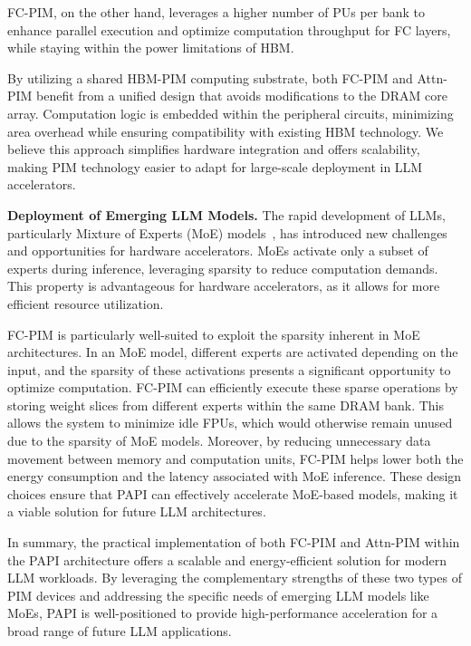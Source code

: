 FC-PIM, on the other hand, leverages a higher number of PUs per bank to enhance parallel execution and optimize computation throughput for FC layers, while staying within the power limitations of HBM.

By utilizing a shared HBM-PIM computing substrate, both FC-PIM and Attn-PIM benefit from a unified design that avoids modifications to the DRAM core array. Computation logic is embedded within the peripheral circuits, minimizing area overhead while ensuring compatibility with existing HBM technology. We believe this approach simplifies hardware integration and offers scalability, making PIM technology easier to adapt for large-scale deployment in LLM accelerators.


\noindent\textbf{Deployment of Emerging LLM Models.}
The rapid development of LLMs, particularly Mixture of Experts (MoE) models~\cite{shazeer2017outrageously, lepikhingshard, fedus2022switch}, has introduced new challenges and opportunities for hardware accelerators. MoEs activate only a subset of experts during inference, leveraging sparsity to reduce computation demands. This property is advantageous for hardware accelerators, as it allows for more efficient resource utilization.

FC-PIM is particularly well-suited to exploit the sparsity inherent in MoE architectures. In an MoE model, different experts are activated depending on the input, and the sparsity of these activations presents a significant opportunity to optimize computation. FC-PIM can efficiently execute these sparse operations by storing weight slices from different experts within the same DRAM bank. This allows the system to minimize idle FPUs, which would otherwise remain unused due to the sparsity of MoE models. Moreover, by reducing unnecessary data movement between memory and computation units, FC-PIM helps lower both the energy consumption and the latency associated with MoE inference. These design choices ensure that PAPI can effectively accelerate MoE-based models, making it a viable solution for future LLM architectures.

In summary, the practical implementation of both FC-PIM and Attn-PIM within the PAPI architecture offers a scalable and energy-efficient solution for modern LLM workloads. By leveraging the complementary strengths of these two types of PIM devices and addressing the specific needs of emerging LLM models like MoEs, PAPI is well-positioned to provide high-performance acceleration for a broad range of future LLM applications.
